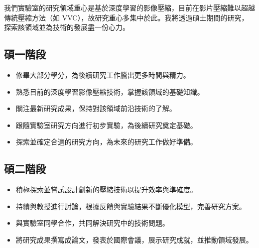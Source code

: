 我們實驗室的研究領域重心是基於深度學習的影像壓縮，目前在影片壓縮難以超越傳統壓縮方法（如 VVC），故研究重心多集中於此。我將透過碩士期間的研究，探索該領域並為技術的發展盡一份心力。

\subsection*{碩一階段}
\begin{itemize}
  \item 修畢大部分學分，為後續研究工作騰出更多時間與精力。
  \item 熟悉目前的深度學習影像壓縮技術，掌握該領域的基礎知識。
  \item 關注最新研究成果，保持對該領域前沿技術的了解。
  \item 跟隨實驗室研究方向進行初步實驗，為後續研究奠定基礎。
  \item 探索並確定合適的研究方向，為未來的研究工作做好準備。
\end{itemize}

\subsection*{碩二階段}
\begin{itemize}
  \item 積極探索並嘗試設計創新的壓縮技術以提升效率與準確度。
  \item 持續與教授進行討論，根據反饋與實驗結果不斷優化模型，完善研究方案。
  \item 與實驗室同學合作，共同解決研究中的技術問題。
  \item 將研究成果撰寫成論文，發表於國際會議，展示研究成就，並推動領域發展。
\end{itemize}